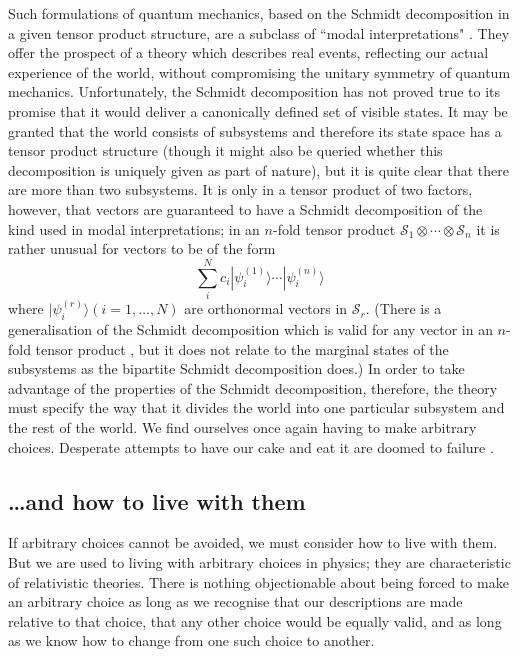 \documentclass[12pt,a4paper,reqno]{article}
\renewcommand{\(}{\left(}
\renewcommand{\)}{\right)}
\renewcommand{\S}{\mathcal{S}}
\newcommand{\ox}{\otimes}
\newcommand{\<}{\langle}
\renewcommand{\>}{\rangle}
\theoremstyle{plain} %
\theoremstyle{definition}
\theoremstyle{remark}
\begin{document}
Such formulations of quantum mechanics, based on the Schmidt
decomposition in a given tensor product structure, are a
subclass of ``modal interpretations" \cite{vanFraassen,
Dieks, BacciaDickson}. They offer the prospect of a theory which
describes real events, reflecting our actual experience of the world, 
without compromising the unitary symmetry of quantum mechanics. 
Unfortunately, the Schmidt decomposition has not
proved true to its promise that it would deliver a canonically defined
set of visible states. It may be granted that the world consists of
subsystems and therefore its state space has a tensor product structure
(though it might also be queried whether this decomposition is uniquely
given as part of nature),
but it is quite clear that there are more than two subsystems. It is
only in a tensor product of two factors, however, that vectors are
guaranteed to have a Schmidt decomposition of the kind used in modal
interpretations; in an $n$-fold tensor product $\S_1\ox\cdots\ox\S_n$ it
is rather unusual \cite{Peres:Schmidt} for vectors to be of the form
\[
\sum_i^N c_i|\psi^{(1)}_i\>\cdots|\psi^{(n)}_i\>
\]
where $|\psi^{(r)}_i\> (i=1,\ldots,N)$ are orthonormal vectors in $\S_r$.
(There is a generalisation of the Schmidt decomposition which is valid
for any vector in an $n$-fold tensor product \cite{Schmidt}, but it does
not relate to the marginal states of the subsystems as the bipartite
Schmidt decomposition does.) In order to take advantage of the properties of
the Schmidt decomposition, therefore, the theory must specify the way
that it divides the world into one particular subsystem and the rest of
the world. We find ourselves once again having to make arbitrary
choices. Desperate attempts to have our cake and eat it are doomed to
failure \cite{Vermaas:nogo}.

\subsection{\ldots and how to live with them}

If arbitrary choices cannot be avoided, we must consider how to live
with them. But we are used to living with arbitrary choices in physics;
they are characteristic of relativistic theories. There is nothing
objectionable about being forced to make an arbitrary choice as long as
we recognise that our descriptions are made relative to that choice,
that any other choice would be equally valid, and as long as we know how to
change from one such choice to another. 
\end{document}
